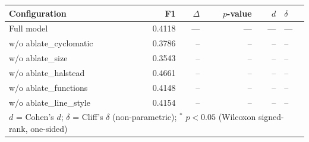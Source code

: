 \begin{tabular}{lrrrrl}
\toprule
Configuration & F1 & $\Delta$ & $p$-value & $d$ & $\delta$ \\
\midrule
Full model & 0.4118 & --- & --- & --- & --- \\
\quad w/o ablate\_cyclomatic & 0.3786 & -- & -- & -- & -- \\
\quad w/o ablate\_size & 0.3543 & -- & -- & -- & -- \\
\quad w/o ablate\_halstead & 0.4661 & -- & -- & -- & -- \\
\quad w/o ablate\_functions & 0.4148 & -- & -- & -- & -- \\
\quad w/o ablate\_line\_style & 0.4154 & -- & -- & -- & -- \\
\bottomrule
\multicolumn{6}{l}{\footnotesize $d$ = Cohen's $d$;\; $\delta$ = Cliff's $\delta$ (non-parametric); $^{*}$ $p < 0.05$ (Wilcoxon signed-rank, one-sided)}
\end{tabular}